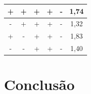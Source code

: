 \documentclass[
12pt,					%
openright,				%
oneside,				%
a4paper,				%
english,
brazil
]{ABNT/abntex2_report}
\begin{document}
\begin{table}[H]
\begin{tabular}{|c|c|c|c|c|c|}
	+              & +               & +                & +                 & -                  & 1,74           \\ \hline
	\rowcolor[HTML]{EFEFEF} 
	-              & +               & +                & +                 & -                  & 1,32           \\ \hline
	+              & -               & +                & +                 & -                  & 1,83           \\ \hline
	\rowcolor[HTML]{EFEFEF} 
	-              & -               & +                & +                 & -                  & 1,40           \\ \hline
	\end{tabular}
	\label{tab:dados_experimento}
	\end{table}





\section*{Conclusão}





	\cleardoublepage
	\titleformat{\chapter}[display]{\vspace*{-24pt}\ABNTEXchapterfont\large\bfseries}{\chaptertitlename\ \thechapter}{12pt}{\Large}
	
\end{document}
